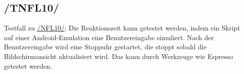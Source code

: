 \subsection*{/TNFL10/}
\label{/TNFL10/} Testfall zu \hyperref[/NFL10/]{/NFL10/}: Die Reaktionszeit kann getestet werden, indem ein \Gls{Skript} auf einer \Gls{Android}-\Gls{Emulation} eine Benutzereingabe simuliert.
Nach der Benutzereingabe wird eine Stoppuhr gestartet, die stoppt sobald die Bildschirmansicht aktualisiert wird.
Das kann durch Werkzeuge wie \Gls{Espresso} getestet werden.